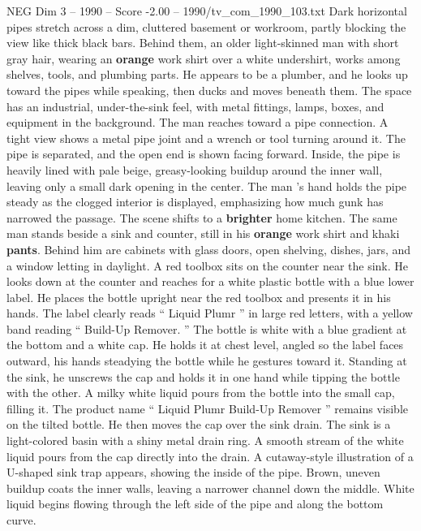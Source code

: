 \begin{textsample}{NEG Dim 3 – 1990 – Score -2.00 – 1990/tv\_com\_1990\_103.txt}  \label{ex:f3_neg_045}
Dark horizontal pipes stretch across a dim, cluttered basement or workroom, partly blocking the view like thick black bars.
Behind them, an older light-skinned man with short gray hair, wearing an \textbf{orange} work shirt over a white undershirt, works among shelves, tools, and plumbing parts.
He appears to be a plumber, and he looks up toward the pipes while speaking, then ducks and moves beneath them.
The space has an industrial, under-the-sink feel, with metal fittings, lamps, boxes, and equipment in the background.
The man reaches toward a pipe connection.
A tight view shows a metal pipe joint and a wrench or tool turning around it.
The pipe is separated, and the open end is shown facing forward.
Inside, the pipe is heavily lined with pale beige, greasy-looking buildup around the inner wall, leaving only a small dark opening in the center.
The man ’s hand holds the pipe steady as the clogged interior is displayed, emphasizing how much gunk has narrowed the passage.
The scene shifts to a \textbf{brighter} home kitchen.
The same man stands beside a sink and counter, still in his \textbf{orange} work shirt and khaki \textbf{pants}.
Behind him are cabinets with glass doors, open shelving, dishes, jars, and a window letting in daylight.
A red toolbox sits on the counter near the sink.
He looks down at the counter and reaches for a white plastic bottle with a blue lower label.
He places the bottle upright near the red toolbox and presents it in his hands.
The label clearly reads “ Liquid Plumr ” in large red letters, with a yellow band reading “ Build-Up Remover. ” The bottle is white with a blue gradient at the bottom and a white cap.
He holds it at chest level, angled so the label faces outward, his hands steadying the bottle while he gestures toward it.
Standing at the sink, he unscrews the cap and holds it in one hand while tipping the bottle with the other.
A milky white liquid pours from the bottle into the small cap, filling it.
The product name “ Liquid Plumr Build-Up Remover ” remains visible on the tilted bottle.
He then moves the cap over the sink drain.
The sink is a light-colored basin with a shiny metal drain ring.
A smooth stream of the white liquid pours from the cap directly into the drain.
A cutaway-style illustration of a U-shaped sink trap appears, showing the inside of the pipe.
Brown, uneven buildup coats the inner walls, leaving a narrower channel down the middle.
White liquid begins flowing through the left side of the pipe and along the bottom curve.

\end{textsample}
